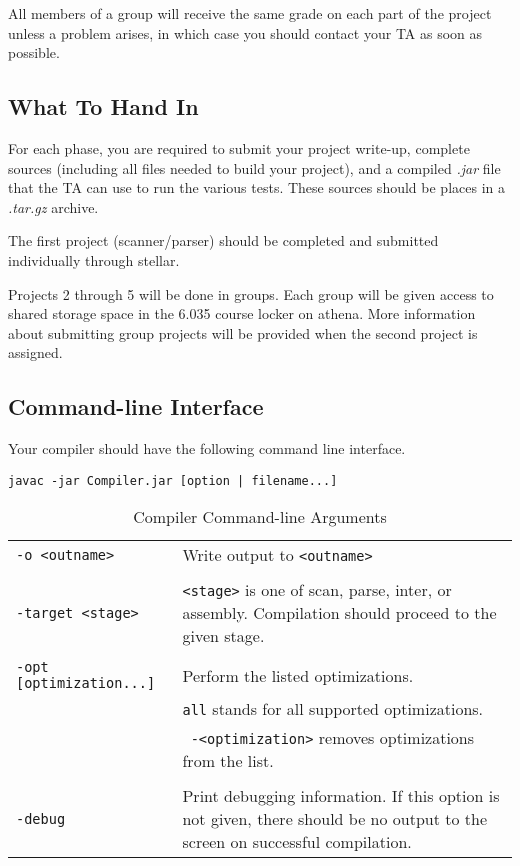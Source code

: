 All members of a group will receive the same grade on each part of the
project unless a problem arises, in which case you should contact your
TA as soon as possible.

\subsection*{What To Hand In}

For each phase, you are required to submit your project write-up, complete
sources (including all files needed to build your project), and a compiled
{\it .jar} file that the TA can use to run the various tests.  These sources
should be places in a {\it .tar.gz} archive.

The first project (scanner/parser) should be completed and submitted
individually through stellar.

Projects 2 through 5 will be done in groups.  Each group will be given
access to shared storage space in the 6.035 course locker on athena.
More information about submitting group projects will be provided when the
second project is assigned.

\subsection*{Command-line Interface}

Your compiler should have the following command line interface.

\begin{verbatim}
javac -jar Compiler.jar [option | filename...]
\end{verbatim}

\begin{table}
\begin{center}
\begin{tabular}{lp{3in}}
\hline

{\tt -o <outname>} & Write output to {\tt <outname>} \\
\\
{\tt -target <stage>} & {\tt <stage>} is one of scan, parse, inter, or
assembly.  Compilation should proceed to the given stage.\\
\\
{\tt -opt [optimization...]} & Perform the listed optimizations.\\ &
{\tt all} stands for all supported optimizations.\\ & {\tt
-<optimization>} removes optimizations from the list.\\
\\
{\tt -debug} & Print debugging information. If this option is not
given, there should be no output to the screen on successful
compilation.\\

\hline
\end{tabular}
\caption{Compiler Command-line Arguments}
\label{tab:commandline}
\end{center}
\end{table}

